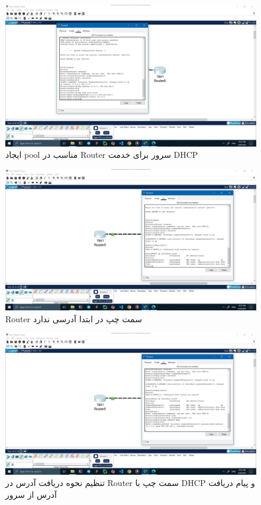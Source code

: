 \documentclass[12pt]{article}
\begin{document}
	\begin{figure}[H]
		\centering
		\includegraphics[width=\textwidth]{resources/scenario3-3.png}
		\caption{ایجاد \textenglish{pool} مناسب در \textenglish{Router} سرور برای خدمت \textenglish{DHCP}}
		\label{3:3}
	\end{figure}
	\begin{figure}[H]
		\centering
		\includegraphics[width=\textwidth]{resources/scenario3-4.png}
		\caption{\textenglish{Router} سمت چپ در ابتدا آدرسی ندارد}
		\label{3:4}
	\end{figure}
	\begin{figure}[H]
		\centering
		\includegraphics[width=\textwidth]{resources/scenario3-5.png}
		\caption{تنظیم نحوه دریافت آدرس در \textenglish{Router} سمت چپ با \textenglish{DHCP} و پیام دریافت آدرس از سرور}
		\label{3:5}
	\end{figure}
\end{document}
